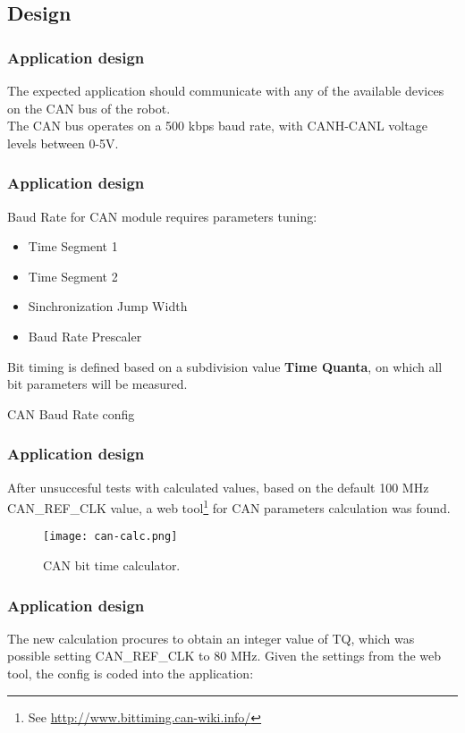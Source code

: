 
\subsection{Design}

\begin{frame}
	\frametitle{Application design}
	The expected application should communicate with any of the available devices on the CAN bus of the robot. \\
	\vfill
	The CAN bus operates on a 500 kbps baud rate, with CANH-CANL voltage levels between 0-5V. %
\end{frame}

\begin{frame}[fragile]
	\frametitle{Application design}
	Baud Rate for CAN module requires parameters tuning:
	\begin{itemize}
		\item Time Segment 1
		\item Time Segment 2
		\item Sinchronization Jump Width
		\item Baud Rate Prescaler
	\end{itemize}
	Bit timing is defined based on a subdivision value \textbf{Time Quanta}, on which all bit parameters will be measured.
	\begin{exampleblock}{CAN Baud Rate config}
	\end{exampleblock}
\end{frame}

\begin{frame}
	\frametitle{Application design}
	After unsuccesful tests with calculated values, based on the default 100 MHz CAN\_REF\_CLK value, a web tool\footnote[frame]{See \underline{http://www.bittiming.can-wiki.info/}} for CAN parameters calculation was found.
	\vfill
	\begin{figure}
		\texttt{[image: can-calc.png]}
		\caption{CAN bit time calculator.}\label{fig:can-calc}
	\end{figure}
\end{frame}

\begin{frame}
	\frametitle{Application design}
	The new calculation procures to obtain an integer value of TQ, which was possible setting CAN\_REF\_CLK to 80 MHz. Given the settings from the web tool, the config is coded into the application:
	
\end{frame}

